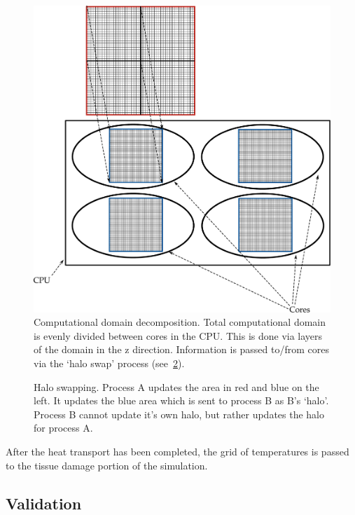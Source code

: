 \begin{figure}
\vspace{-45pt}
\centering
\includegraphics[scale=.35]{./ablation/images/grid-decomp.pdf}
\caption{Computational domain decomposition. Total computational domain is evenly divided between cores in the CPU. This is done via layers of the domain in the z direction. Information is passed to/from cores via the `halo swap' process (see~\cref{fig:haloswap}).}
\label{fig:griddecomp}
\vspace{-10pt}
\end{figure}

\begin{figure}
\centering
\def\svgwidth{350pt}

\caption{Halo swapping. Process A updates the area in red and blue on the left. It updates the blue area which is sent to process B as B's `halo'. Process B cannot update it's own halo, but rather updates the halo for process A.}
\label{fig:haloswap}
\end{figure}


After the heat transport has been completed, the grid of temperatures is passed to the tissue damage portion of the simulation.
\newpage
\subsection{Validation}



